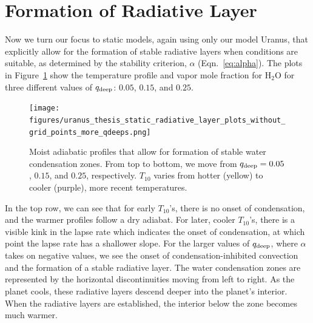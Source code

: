 \documentclass[11pt]{ucscthesisbs}
\begin{document}
\section{Formation of Radiative Layer}
Now we turn our focus to static models, again using only our model Uranus, that explicitly allow for the formation of stable radiative layers when conditions are suitable, as determined by the stability criterion, $\alpha$ (Eqn.~\ref{eq:alpha}). The plots in Figure~\ref{fig:radiative} show the temperature profile and vapor mole fraction for H$_{2}$O for three different values of $q_{\rm deep}$: $0.05$, $0.15$, and $0.25$. 
\begin{figure}[ht]
 \centerline{
  \texttt{[image: figures/uranus\_thesis\_static\_radiative\_layer\_plots\_without\_grid\_points\_more\_qdeeps.png]}
 }{}
\caption[Formation of Radiative Layer]
{Moist adiabatic profiles that allow for formation of stable water condensation zones. From top to bottom, we move from $q_{\rm deep} = 0.05$, $0.15$, and $0.25$, respectively. $T_{10}$ varies from hotter (yellow) to cooler (purple), more recent temperatures.}
\label{fig:radiative}
\end{figure}
In the top row, we can see that for early $T_{10}$'s, there is no onset of condensation, and the warmer profiles follow a dry adiabat. For later, cooler $T_{10}$'s, there is a visible kink in the lapse rate which indicates the onset of condensation, at which point the lapse rate has a shallower slope. For the larger values of $q_{\rm deep}$, where $\alpha$ takes on negative values, we see the onset of condensation-inhibited convection and the formation of a stable radiative layer. The water condensation zones ar{}e represented by the horizontal discontinuities moving from left to right. As the planet cools, these radiative layers descend deeper into the planet's interior. When the radiative layers are established, the interior below the zone becomes much warmer. 
\end{document}

